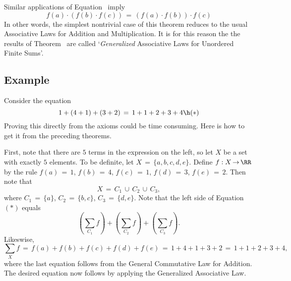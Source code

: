         Similar applications of Equation~ imply
        \begin{displaymath}
        f(a){\cdot}(f(b){\cdot}f(c)) \,=\, (f(a){\cdot}f(b)){\cdot}f(c)
        \end{displaymath}
    In other words, the simplest nontrivial case of this theorem reduces to the usual Associative Laws for Addition and Multiplication.
    It is for this reason the the results of Theorem~ are called `{\em Generalized} Associative Laws for Unordered Finite Sums'.

\V
\V

            \subsection{\small{\bf Example}}
            \label{ExampB10.70}

        Consider the equation
        \begin{displaymath}
        1+(4+1)+(3+2) \,=\, 1+1+2+3+4 \h ({\ast})
        \end{displaymath}
    Proving this directly from the axioms could be time consuming. Here is how to get it from the preceding theorems.

        First, note that there are $5$ terms in the expression on the left, so let $X$ be a set with exactly $5$ elements.
    To be definite, let $X \,=\, \{a,b,c,d,e\}$. Define $f:X \,{\rightarrow}\, {\RR}$ by the rule $f(a) \,=\, 1$, $f(b) \,=\, 4$, $f(c) \,=\, 1$, $f(d) \,=\, 3$, $f(e) \,=\, 2$.
    Then note that
        \begin{displaymath}
        X \,=\, C_{1}\,{\cup}\,C_{2}\,{\cup}\,C_{3},
        \end{displaymath}
    where $C_{1} \,=\, \{a\}$, $C_{2} \,=\, \{b,c\}$, $C_{3} \,=\, \{d,e\}$.
    Note that the left side of Equation~$({\ast})$ equals
        \begin{displaymath}
        ({\sum}_{C_{1}} f)+ ({\sum}_{C_{2}} f) + ({\sum}_{C_{3}} f).
        \end{displaymath}
    Likeswise,
        \begin{displaymath}
        {\sum}_{X} f \,=\, f(a) + f(b) + f(c) + f(d) + f(e) \,=\, 1+4+1+3+2 \,=\, 1+1+2+3+4,
        \end{displaymath}
    where the last equation follows from the General Commutative Law for Addition.
    The desired equation now follows by applying the Generalized Associative Law.


\V
\V

